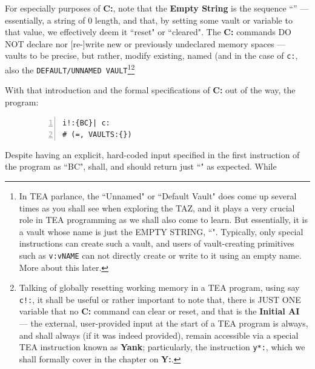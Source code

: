 \documentclass[a4paper, 18pt]{book} %
\begin{document}
For especially purposes of \textbf{C:}, note that the \textbf{Empty String} is the sequence “” --- essentially, a string of 0 length, and that, by setting some vault or variable to that value, we effectively deem it ``reset" or ``cleared". The \textbf{C:} commands DO NOT declare nor [re-]write new or previously undeclared memory spaces --- vaults to be precise, but rather, modify existing, named (and in the case of \texttt{c:}, also the \texttt{DEFAULT/UNNAMED VAULT}\footnote{In TEA parlance, the ``Unnamed" or ``Default Vault" does come up several times as you shall see when exploring the TAZ, and it plays a very crucial role in TEA programming as we shall also come to learn. But essentially, it is a vault whose name is just the EMPTY STRING, ``". Typically, only special instructions can create such a vault, and users of vault-creating primitives such as \texttt{v:vNAME} can not directly create or write to it using an empty name. More about this later.}\footnote{Talking of globally resetting working memory in a TEA program, using say \texttt{c!:}, it shall be useful or rather important to note that, there is JUST ONE variable that no \textbf{C:} command can clear or reset, and that is the \textbf{Initial AI} --- the external, user-provided input at the start of a TEA program is always, and shall always (if it was indeed provided), remain accessible via a special TEA instruction known as \textbf{Yank}; particularly, the instruction \texttt{y*:}, which we shall formally cover in the chapter on \textbf{Y:}.}


With that introduction and the formal specifications of \textbf{C:} out of the way, the program:


 \begin{figure}[H]
 \Large
  \centering
  \begin{tcolorbox}[teaterminalstyle, title=TEA Program: resetting explicitly set AI]
  \begin{lstlisting}[language=TEA, caption={TP C1}, label={LSTC1}, numbers=left]
i!:{BC}| c:
# (=, VAULTS:{})
   \end{lstlisting}
  \end{tcolorbox}
\end{figure}

Despite having an explicit, hard-coded input specified in the first instruction of the program as ``BC", shall, and should return just ``" as expected. While  
\end{document}
